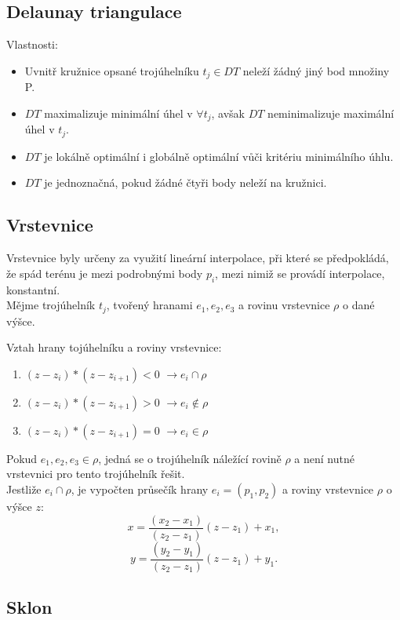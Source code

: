 \documentclass[a4paper, 12pt]{article}
\begin{document}
\subsection{Delaunay triangulace}
Vlastnosti:
\begin{itemize}
\item Uvnitř kružnice opsané trojúhelníku $t_j \in DT$ neleží žádný jiný bod množiny P.
\item $DT$ maximalizuje minimální úhel v $\forall t_j$, avšak $DT$ neminimalizuje maximální úhel v $t_j$.
\item $DT$ je lokálně optimální i globálně optimální vůči kritériu minimálního úhlu.
\item $DT$ je jednoznačná, pokud žádné čtyři body neleží na kružnici.
\end{itemize}
\vspace{1.5cm}

\subsection{Vrstevnice}
Vrstevnice byly určeny za využití lineární interpolace, při které se předpokládá, že spád terénu je mezi podrobnými body $p_i$, mezi nimiž se provádí interpolace, konstantní.\\

Mějme trojúhelník $t_j$, tvořený hranami $e_1, e_2, e_3$ a rovinu vrstevnice $\rho$ o dané výšce.

Vztah hrany tojúhelníku a roviny vrstevnice:
\begin{enumerate}
\item $(z-z_i)*(z-z_{i+1}) < 0$  $\longrightarrow e_i \cap \rho$
\item $(z-z_i)*(z-z_{i+1}) > 0$  $\longrightarrow e_i \notin \rho$ 
\item $(z-z_i)*(z-z_{i+1}) = 0$  $\longrightarrow e_i \in \rho$
\end{enumerate}

\noindent Pokud  $e_1, e_2, e_3 \in \rho$, jedná se o trojúhelník náležící rovině $\rho$ a není nutné vrstevnici pro tento trojúhelník řešit.\\
Jestliže $e_i \cap \rho$, je vypočten průsečík hrany $e_i = (p_1, p_2)$ a roviny vrstevnice $\rho$ o výšce $z$:
$$ x = \frac{(x_2-x_1)}{(z_2-z_1)}(z-z_1)+x_1, $$
$$ y = \frac{(y_2-y_1)}{(z_2-z_1)}(z-z_1)+y_1.$$
\clearpage

\subsection{Sklon}
\end{document}

